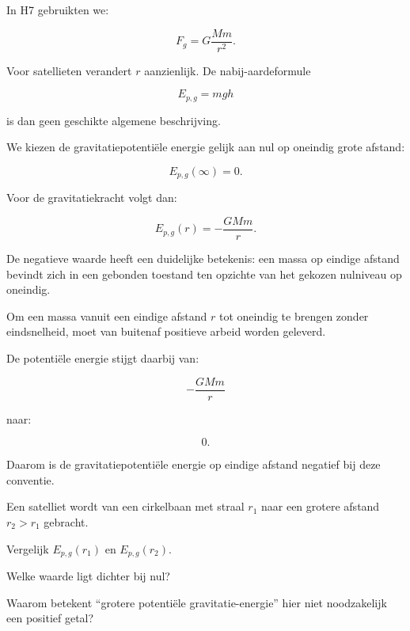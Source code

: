 \documentclass{ximera}
\begin{document}

In H7 gebruikten we:

\[
F_g=G\frac{Mm}{r^2}.
\]

Voor satellieten verandert $r$ aanzienlijk. De nabij-aardeformule

\[
E_{p,g}=mgh
\]

is dan geen geschikte algemene beschrijving.

We kiezen de gravitatiepotentiële energie gelijk aan nul op oneindig grote
afstand:

\[
E_{p,g}(\infty)=0.
\]

Voor de gravitatiekracht volgt dan:

\[
\boxed{
E_{p,g}(r)=-\frac{GMm}{r}.
}
\]

De negatieve waarde heeft een duidelijke betekenis: een massa op eindige
afstand bevindt zich in een gebonden toestand ten opzichte van het gekozen
nulniveau op oneindig.



Om een massa vanuit een eindige afstand $r$ tot oneindig te brengen zonder
eindsnelheid, moet van buitenaf positieve arbeid worden geleverd.

De potentiële energie stijgt daarbij van:

\[
-\frac{GMm}{r}
\]

naar:

\[
0.
\]

Daarom is de gravitatiepotentiële energie op eindige afstand negatief bij
deze conventie.


\begin{oefening}{\oefU}

Een satelliet wordt van een cirkelbaan met straal $r_1$ naar een grotere
afstand $r_2>r_1$ gebracht.

\begin{question}
Vergelijk $E_{p,g}(r_1)$ en $E_{p,g}(r_2)$.
\end{question}

\begin{question}
Welke waarde ligt dichter bij nul?
\end{question}

\begin{question}
Waarom betekent ``grotere potentiële gravitatie-energie'' hier niet
noodzakelijk een positief getal?
\end{question}

\end{oefening}
\end{document}
